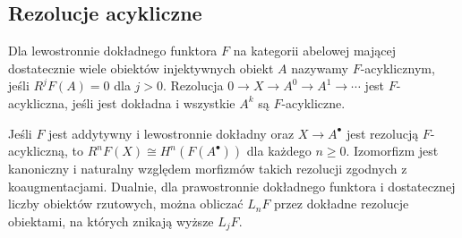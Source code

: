 \subsection{Rezolucje acykliczne}
\begin{definicja}\label{cat:def:acyclic-resolution}
Dla lewostronnie dokładnego funktora $F$ na kategorii abelowej mającej dostatecznie wiele obiektów injektywnych obiekt $A$ nazywamy $F$-acyklicznym, jeśli $R^jF(A)=0$ dla $j>0$. Rezolucja $0\to X\to A^0\to A^1\to\cdots$ jest $F$-acykliczna, jeśli jest dokładna i wszystkie $A^k$ są $F$-acykliczne.
\end{definicja}
\begin{twierdzenie}\label{cat:thm:acyclic-resolution}
Jeśli $F$ jest addytywny i lewostronnie dokładny oraz $X\to A^\bullet$ jest rezolucją $F$-acykliczną, to $R^nF(X)\cong H^n(F(A^\bullet))$ dla każdego $n\ge0$. Izomorfizm jest kanoniczny i naturalny względem morfizmów takich rezolucji zgodnych z koaugmentacjami. Dualnie, dla prawostronnie dokładnego funktora i dostatecznej liczby obiektów rzutowych, można obliczać $L_nF$ przez dokładne rezolucje obiektami, na których znikają wyższe $L_jF$.
\end{twierdzenie}
